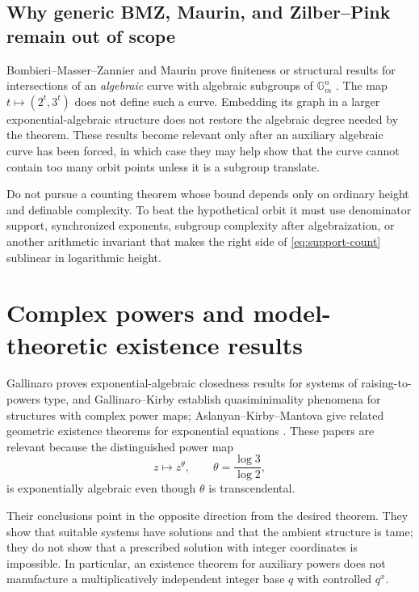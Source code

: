 \documentclass[10pt,letterpaper]{article}
\newcommand{\Gm}{\mathbb G_m}
\begin{document}
\subsection{Why generic BMZ, Maurin, and Zilber--Pink remain out of scope}

Bombieri--Masser--Zannier and Maurin prove finiteness or structural results for intersections
of an \emph{algebraic} curve with algebraic subgroups of \(\Gm^n\)
\cite{BMZ1999,Maurin2008}.  The map \(t\mapsto(2^t,3^t)\) does not define such a curve.
Embedding its graph in a larger exponential-algebraic structure does not restore the
algebraic degree needed by the theorem.  These results become relevant only after an
auxiliary algebraic curve has been forced, in which case they may help show that the curve
cannot contain too many orbit points unless it is a subgroup translate.

\begin{stopbox}
Do not pursue a counting theorem whose bound depends only on ordinary height and definable
complexity.  To beat the hypothetical orbit it must use denominator support, synchronized
exponents, subgroup complexity after algebraization, or another arithmetic invariant that
makes the right side of \cref{eq:support-count} sublinear in logarithmic height.
\end{stopbox}

\section{Complex powers and model-theoretic existence results}
\label{sec:powers}

Gallinaro proves exponential-algebraic closedness results for systems of raising-to-powers
type, and Gallinaro--Kirby establish quasiminimality phenomena for structures with complex
power maps; Aslanyan--Kirby--Mantova give related geometric existence theorems for exponential
equations \cite{Gallinaro2025,GallinaroKirby,AslanyanKirbyMantova}.  These papers are
relevant because the distinguished power map
\[
  z\longmapsto z^\theta,
  \qquad \theta=\frac{\log3}{\log2},
\]
is exponentially algebraic even though \(\theta\) is transcendental.

Their conclusions point in the opposite direction from the desired theorem.  They show that
suitable systems have solutions and that the ambient structure is tame; they do not show
that a prescribed solution with integer coordinates is impossible.  In particular, an
existence theorem for auxiliary powers does not manufacture a multiplicatively independent
integer base \(q\) with controlled \(q^x\).
\end{document}
